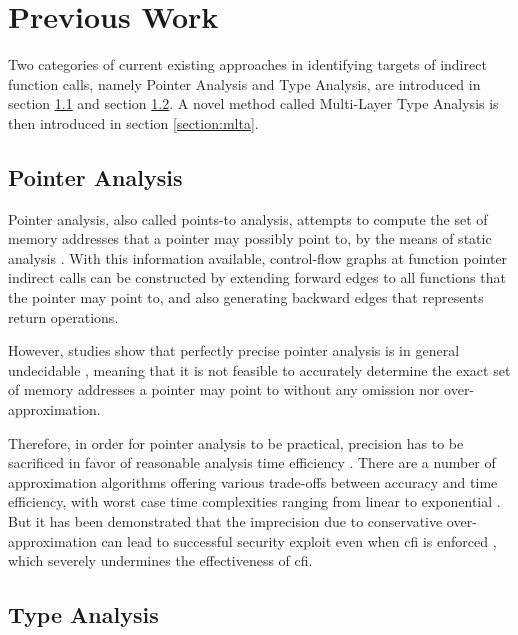 \chapter{Previous Work}
\label{chapter:previous-work}

Two categories of current existing approaches in identifying targets of indirect function calls, namely Pointer Analysis and Type Analysis, are introduced in section \ref{section:pointer-analysis} and section \ref{section:type-analysis}. A novel method called Multi-Layer Type Analysis is then introduced in section \ref{section:mlta}.

\section{Pointer Analysis}
\label{section:pointer-analysis}

Pointer analysis, also called points-to analysis, attempts to compute the set of memory addresses that a pointer may possibly point to, by the means of static analysis  \cite{hind2001pointer}. With this information available, control-flow graphs at function pointer indirect calls can be constructed by extending forward edges to all functions that the pointer may point to, and also generating backward edges that represents return operations.

However, studies show that perfectly precise pointer analysis is in general undecidable \cite{undecidability-of-aliasing} \cite{undecidability-of-static-analysis} , meaning that it is not feasible to accurately determine the exact set of memory addresses a pointer may point to without any omission nor over-approximation.

Therefore, in order for pointer analysis to be practical, precision has to be sacrificed in favor of reasonable analysis time efficiency \cite{jujutsu}. There are a number of approximation algorithms offering various trade-offs between accuracy and time efficiency, with worst case time complexities ranging from linear to exponential \cite{hind2001pointer}. But it has been demonstrated that the imprecision due to conservative over-approximation can lead to successful security exploit even when \ac{cfi} is enforced \cite{jujutsu}, which severely undermines the effectiveness of \ac{cfi}.

\section{Type Analysis}
\label{section:type-analysis}

